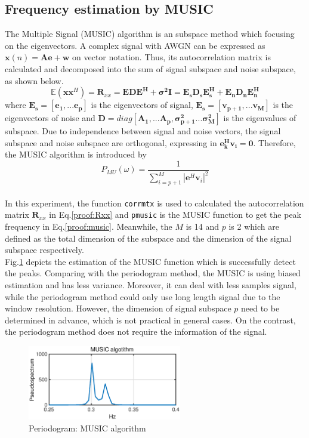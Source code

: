 \subsection{Frequency estimation by MUSIC}
The Multiple Signal (MUSIC) algorithm is an subspace method which focusing on the eigenvectors. A complex signal with AWGN can be expressed as $\mathbf x(n)=\mathbf A \mathbf e +\mathbf w$ on vector notation. Thus, its autocorrelation matrix is calculated and decomposed into the sum of signal subspace and noise subspace, as shown below. 
\begin{equation}
\mathbb {E}(\mathbf{x x}^H)=\mathbf R_{xx}=\mathbf{EDE^H+\sigma^2I}=\mathbf{E_sD_sE^H_s+E_nD_nE^H_n}
\label{proof:Rxx}
\end{equation}
where $\mathbf{E_s=[e_1,...e_p]}$ is the eigenvectors of signal, $\mathbf{E_s=[v_{p+1},...v_M]}$ is the eigenvectors of noise and $\mathbf{D}=diag\mathbf {[A_1,...A_p,\sigma^2_{p+1}...\sigma^2_M]}$ is the eigenvalues of subspace. Due to independence between signal and noise vectors, the signal subspace and noise subspace are orthogonal, expressing in $\mathbf {e_k^Hv_i=0}$. Therefore, the MUSIC algorithm is introduced by
\begin{equation}
{\hat P_{MU}(\omega)}=\frac {1}{\sum_{i=p+1}^M \left | \mathbf{e}^H \mathbf{v}_i\right |^2}
\label{proof:music}
\end{equation}\\
In this experiment, the function \texttt{corrmtx} is used to calculated the autocorrelation matrix $\mathbf R_{xx}$ in Eq.\ref{proof:Rxx} and \texttt{pmusic} is the MUSIC function to get the peak frequency in Eq.\ref{proof:music}. Meanwhile, the $M$ is 14 and $p$ is 2 which are defined as the total dimension of the subspace and the dimension of the signal subspace respectively.\\
Fig.\ref{fig:1_3_e} depicts the estimation of the MUSIC function which is successfully detect the peaks. Comparing with the periodogram method, the MUSIC is using biased estimation and has less variance. Moreover, it can deal with less samples signal, while the periodogram method could only use long length signal due to the window resolution. However, the dimension of signal subspace $p$ need to be determined in advance, which is not practical in general cases. On the contrast, the periodogram method does not require the information of the signal.
\begin{figure}[htbp]
    \centering
    \includegraphics[width=0.6\textwidth]{fig/13/13e.eps}
    \caption{Periodogram: MUSIC algorithm}
    \label{fig:1_3_e}
\end{figure}



